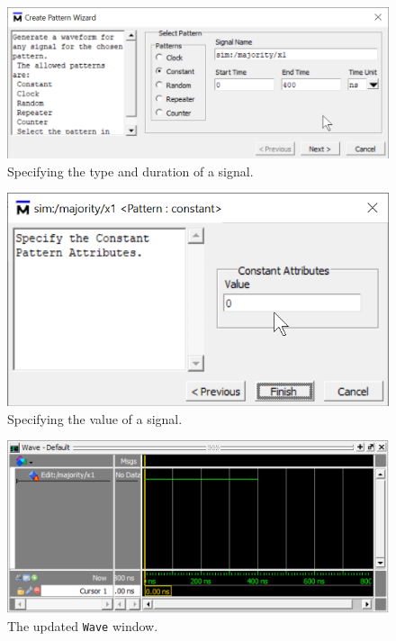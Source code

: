 \documentclass[11pt, twoside, pdftex]{article}
\begin{document}
\begin{figure}[H]
   \begin{center}
      \includegraphics[scale=1.0]{figures/figure11.png}
   \caption{Specifying the type and duration of a signal.} 
	 \label{fig:11}
	 \end{center}
\end{figure}

\begin{figure}[H]
   \begin{center}
      \includegraphics[scale=1.0]{figures/figure12.png}
   \caption{Specifying the value of a signal.} 
	 \label{fig:12}
	 \end{center}
\end{figure}

\begin{figure}[H]
   \begin{center}
      \includegraphics[scale=.75]{figures/figure13.png}
       \caption{The updated \texttt{Wave} window.} 
	 \label{fig:13}
	 \end{center}
\end{figure}
\end{document}
